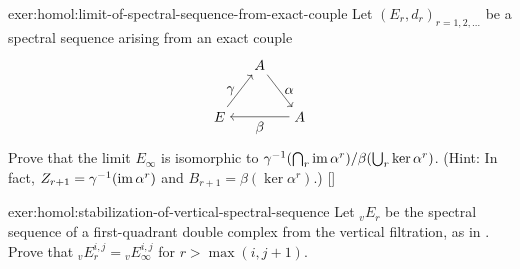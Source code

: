 \begin{exer}{\exerused{}}{exer:homol:limit-of-spectral-sequence-from-exact-couple}
  Let $(E_r,d_r)_{r=1,2,\dots}$ be a spectral sequence arising from an
  exact couple
  \[
    \begin{tikzpicture}[baseline=(current bounding box.center)]
      \node (A) at (1,1.3) {$A$}; \node (E) at (0,0)
      {$E$}; \node (A2) at (2,0)
      {$A$}; \draw[->] (A) -- (A2) node[midway, right]
      {$\alpha$}; \draw[->] (A2) -- (E) node[midway, below]
      {$\beta$}; \draw[->] (E) -- (A) node[midway, left] {$\gamma$};
    \end{tikzpicture}
  \]
  Prove that the limit $E_\infty$ is isomorphic to
  $\gamma^{-1}(\bigcap_r \operatorname{im}\alpha^r) / \beta(\bigcup_r
  \ker\alpha^r)$. (Hint: In fact,
  $Z_{r+1} = \gamma^{-1}(\operatorname{im}\alpha^r)$ and
  $B_{r+1} = \beta(\ker\alpha^r)$.)
  []
\end{exer}

\begin{exer}{}{exer:homol:stabilization-of-vertical-spectral-sequence}
  Let ${}_vE_r$ be the spectral sequence of a first-quadrant double
  complex from the vertical filtration, as in
  . Prove that
  ${}_vE_r^{i,j} = {}_vE_\infty^{i,j}$ for $r > \max(i, j+1)$.
\end{exer}


